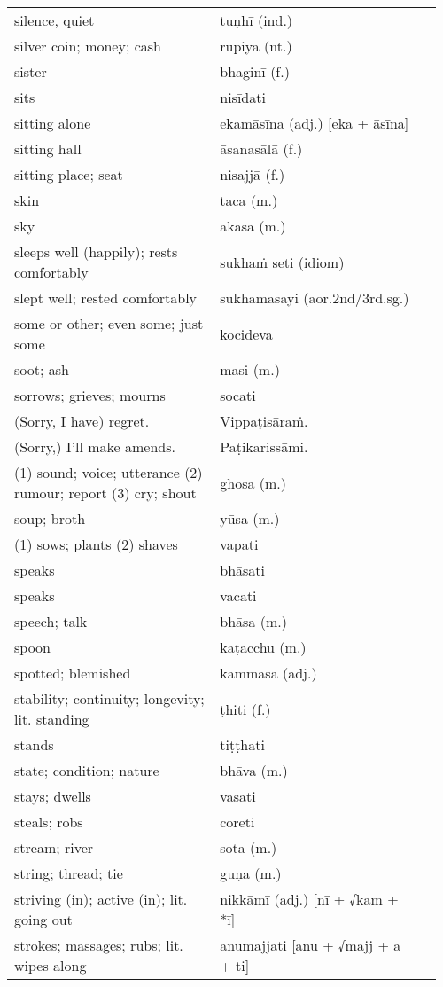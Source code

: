 \documentclass[a5paper]{memoir}
\begin{document}
\begin{longtable}{L{0.48\linewidth} L{0.48\linewidth} H}
silence, quiet & tuṇhī (ind.) & \\
silver coin; money; cash & rūpiya (nt.) & \\
sister & bhaginī (f.) & \\
sits & nisīdati & \\
sitting alone & ekamāsīna (adj.) [eka + āsīna] & \\
sitting hall & āsanasālā (f.) & \\
sitting place; seat & nisajjā (f.) & \\
skin & taca (m.) & \\
sky & ākāsa (m.) & \\
sleeps well (happily); rests comfortably & sukhaṁ seti (idiom) & \\
slept well; rested comfortably & sukhamasayi (aor.2nd/3rd.sg.) & \\
some or other; even some; just some & kocideva & \\
soot; ash & masi (m.) & \\
sorrows; grieves; mourns & socati & \\
(Sorry, I have) regret. & Vippaṭisāraṁ. & \\
(Sorry,) I'll make amends. & Paṭikarissāmi. & \\
(1) sound; voice; utterance (2) rumour; report (3) cry; shout & ghosa (m.) & \\
soup; broth & yūsa (m.) & \\
(1) sows; plants (2) shaves & vapati & \\
speaks & bhāsati & \\
speaks & vacati & \\
speech; talk & bhāsa (m.) & \\
spoon & kaṭacchu (m.) & \\
spotted; blemished & kammāsa (adj.) & \\
stability; continuity; longevity; lit. standing & ṭhiti (f.) & \\
stands & tiṭṭhati & \\
state; condition; nature & bhāva (m.) & \\
stays; dwells & vasati & \\
steals; robs & coreti & \\
stream; river & sota (m.) & \\
string; thread; tie & guṇa (m.) & \\
striving (in); active (in); lit. going out & nikkāmī (adj.) [nī + √kam + *ī] & \\
strokes; massages; rubs; lit. wipes along & anumajjati [anu + √majj + a + ti] & \\

\end{longtable}
\end{document}
